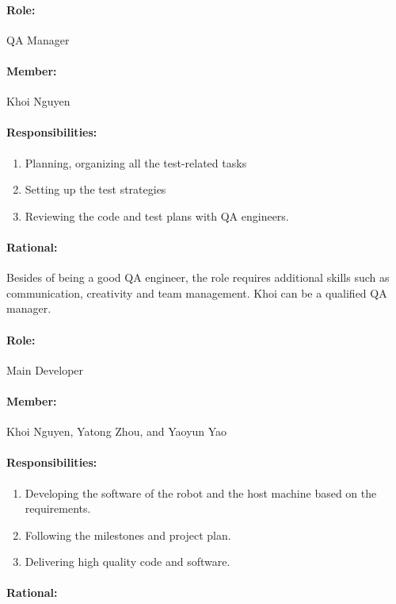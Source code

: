 \documentclass[11pt, a4paper]{report}
\begin{document}
\paragraph{Role: } QA Manager
\paragraph{Member: } Khoi Nguyen
\paragraph{Responsibilities: }
\begin{enumerate}
	\item  Planning, organizing all the test-related tasks
	\item  Setting up the test strategies
	\item  Reviewing the code and test plans with QA engineers.
\end{enumerate}
\paragraph{Rational: \\}
Besides of being a good QA engineer, the role requires additional skills such as communication, creativity and team management. Khoi can be a qualified QA manager.

\paragraph{Role: } Main Developer
\paragraph{Member: } Khoi Nguyen, Yatong Zhou, and Yaoyun Yao
\paragraph{Responsibilities: }
\begin{enumerate}
	\item  Developing the software of the robot and the host machine based on the requirements.
	\item  Following the milestones and project plan. 
	\item  Delivering high quality code and software.
\end{enumerate}
\paragraph{Rational: \\}
\end{document}

